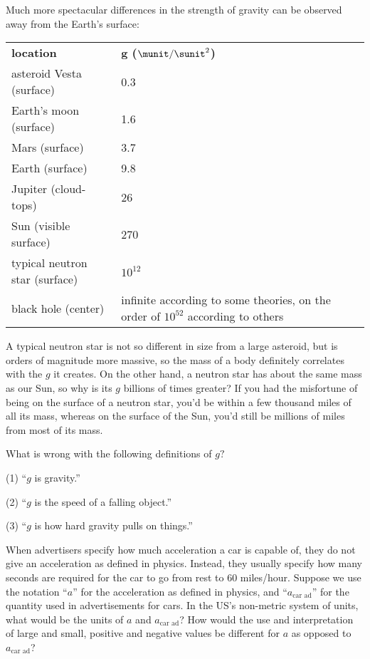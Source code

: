 Much more spectacular differences in the strength of gravity
can be observed away from the Earth's surface:

\begin{tabular}{lp{55mm}}
\textbf{location} & \textbf{g ($\munit/\sunit^2$)} \\
asteroid Vesta (surface)       & 0.3 \\
Earth's moon (surface)         & 1.6 \\
Mars (surface)                 & 3.7 \\
Earth (surface)                & 9.8 \\
Jupiter (cloud-tops)           & 26 \\
Sun (visible surface)          & 270 \\
typical neutron star (surface) & $10^{12}$ \\
black hole (center)            & infinite according to some theories, on the order of $10^{52}$ according
                                 to others
\end{tabular}

\noindent A typical neutron star is not so different in size from a
large asteroid, but is orders of magnitude more massive, so
the mass of a body definitely correlates with the $g$ it
creates. On the other hand, a neutron star has about the
same mass as our Sun, so why is its $g$ billions of times
greater? If you had the misfortune of being on the surface
of a neutron star, you'd be within a few thousand miles of
all its mass, whereas on the surface of the Sun, you'd still
be millions of miles from most of its mass.


\startdqs

\begin{dq}
What is wrong with the following definitions of $g?$

(1) ``$g$ is gravity.''

(2) ``$g$ is the speed of a falling object.''

(3) ``$g$ is how hard gravity pulls on things.''
\end{dq}

\begin{dq}
When advertisers specify how much acceleration a car is
capable of, they do not give an acceleration as defined in
physics. Instead, they usually specify how many seconds are
required for the car to go from rest to 60 miles/hour.
Suppose we use the notation ``$a$'' for the acceleration as
defined in physics, and ``$a_\text{car ad}$'' for the quantity used in
advertisements for cars. In the US's non-metric system of
units, what would be the units of $a$ and $a_\text{car ad}$? How would
the use and interpretation of large and small, positive and
negative values be different for $a$ as opposed to $a_\text{car ad}$?
\end{dq}

